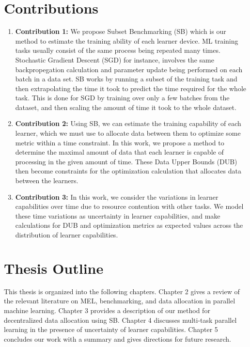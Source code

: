 \section{Contributions}

\begin{enumerate}
  \item \textbf{Contribution 1:} We propose Subset Benchmarking (SB) which is our method to estimate the training ability of each learner device. ML training tasks usually consist of the same process being repeated many times. Stochastic Gradient Descent (SGD) for instance, involves the same backpropegation calculation and parameter update being performed on each batch in a data set. SB works by running a subset of the training task and then extrapolating the time it took to predict the time required for the whole task. This is done for SGD by training over only a few batches from the dataset, and then scaling the amount of time it took to the whole dataset.
      
  \item \textbf{Contribution 2:} Using SB, we can estimate the training capability of each learner, which we must use to allocate data between them to optimize some metric within a time constraint. In this work, we propose a method to determine the maximal amount of data that each learner is capable of processing in the given amount of time. These Data Upper Bounds (DUB) then become constraints for the optimization calculation that allocates data between the learners.
  
  \item \textbf{Contribution 3:} In this work, we consider the variations in learner capabilities over time due to resource contention with other tasks. We model these time variations as uncertainty in learner capabilities, and make calculations for DUB and optimization metrics as expected values across the distribution of learner capabilities.
  
\end{enumerate}

\section{Thesis Outline}

This thesis is organized into the following chapters. Chapter 2 gives a review of the relevant literature on MEL, benchmarking, and data allocation in parallel machine learning. Chapter 3 provides a description of our method for decentralized data allocation using SB. Chapter 4 discusses multi-task parallel learning in the presence of uncertainty of learner capabilities. Chapter 5 concludes our work with a summary and gives directions for future research.